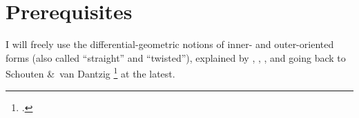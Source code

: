 \documentclass[\ifafour a4paper,12pt,\else a5paper,10pt,\fi%
onecolumn,oneside,article,%
british%
]{memoir}
\theoremstyle{remark}
\theoremstyle{innote}
\newcommand*{\citep}{\footcites}
\newcommand*{\citey}{\footcites}%
\newcommand*{\amp}{\&}
\renewcommand*{\|}[1][]{\nonscript\,#1\vert\nonscript\;\mathopen{}}
\newcommand*{\sect}{\S}%
\newcommand*{\chap}{ch.}%
\newcommand*{\chaps}{chs}%
\begin{document}




\section{Prerequisites}
\label{sec:prereqs}

I will freely use the differential-geometric notions of inner- and
outer-oriented forms (also called \enquote{straight} and
\enquote{twisted}), explained by
\textcites{burke1995}[\chap~IV]{burke1985_r1987}{burke1983},
\textcites[\chaps~2, 3]{bossavit1991}{bossavit1998b},
\textcite[\chap~A]{hehletal2003}, and going back to Schouten \amp\ van
Dantzig \citey{schoutenetal1940} at the latest.
\end{document}
